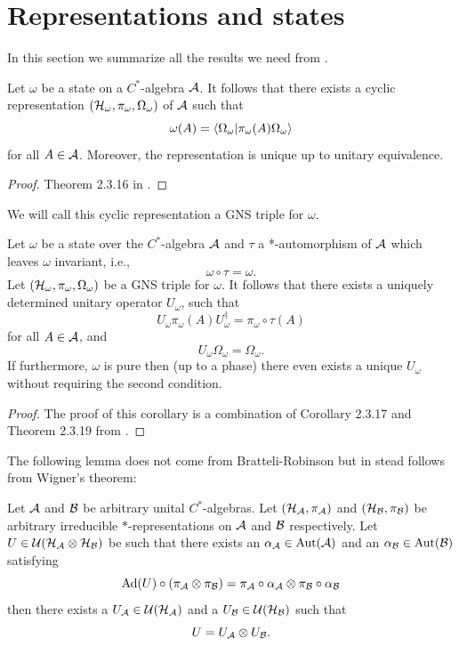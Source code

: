 \documentclass[12pt,a4paper,twoside]{article}
\numberwithin{equation}{section}
\begin{document}
\section{Representations and states}
In this section we summarize all the results we need from \cite{bratteli1979operator}.
\begin{theorem}\label{thrm:ExistenceGNS}
	Let $\omega$ be a state on a $C^*$-algebra $\AA$. It follows that there exists a cyclic representation $(\HH_\omega,\pi_\omega,\Omega_\omega)$ of $\AA$ such that
	\[\omega(A)=\bra{\Omega_\omega}\ket{\pi_\omega(A)\Omega_\omega}\]
	for all $A\in\AA$. Moreover, the representation is unique up to unitary equivalence.
\end{theorem}
\begin{proof}
	Theorem 2.3.16 in \cite{bratteli1979operator}.
\end{proof}
We will call this cyclic representation a GNS triple for $\omega$.
\begin{corollary}\label{cor:ExistenceOfUnitary}
	Let $\omega$ be a state over the $C^*$-algebra $\AA$ and $\tau$ a *-automorphism of $\AA$ which leaves $\omega$ invariant, i.e.,
	\[\omega\circ\tau=\omega.\]
	Let $(\HH_\omega,\pi_\omega,\Omega_\omega)$ be a GNS triple for $\omega$. It follows that there exists a uniquely determined unitary operator $U_\omega$, such that
	\[U_\omega \pi_\omega(A)U_\omega^\dagger=\pi_\omega\circ\tau(A) \]
	for all $A\in\AA$, and
	\[U_\omega\Omega_\omega=\Omega_\omega. \]
	If furthermore, $\omega$ is pure then (up to a phase) there even exists a unique $U_\omega$ without requiring the second condition.
\end{corollary}
\begin{proof}
	The proof of this corollary is a combination of Corollary 2.3.17 and Theorem 2.3.19 from \cite{bratteli1979operator}.
\end{proof}
The following lemma does not come from Bratteli-Robinson but in stead follows from Wigner's theorem:
\begin{lemma}\label{lem:SplittingOfUnitary}
	Let $\AA$ and $\BB$ be arbitrary unital $C^*$-algebras. Let $(\HH_\AA,\pi_\AA)$ and $(\HH_\BB,\pi_\BB)$ be arbitrary irreducible $*$-representations on $\AA$ and $\BB$ respectively. Let $U\in\UU(\HH_\AA\otimes\HH_\BB)$ be such that there exists an $\alpha_\AA\in\Aut{\AA}$ and an $\alpha_\BB\in\Aut{\BB}$ satisfying
	\begin{equation}
		\Ad{U}\circ(\pi_\AA\otimes\pi_\BB)=\pi_\AA\circ\alpha_\AA\otimes\pi_\BB\circ\alpha_\BB
	\end{equation}
	then there exists a $U_\AA\in\UU(\HH_\AA)$ and a $U_\BB\in\UU(\HH_\BB)$ such that
	\begin{equation}
		U=U_\AA\otimes U_\BB.
	\end{equation}
\end{lemma}
\end{document}
